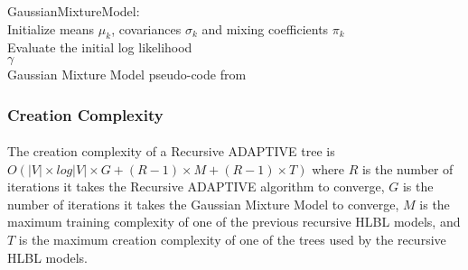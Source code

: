 \begin{algorithm} \label{code:GMM}
\SetAlgoLined
GaussianMixtureModel:
\\
Initialize means $\mu_k$, covariances $\sigma_k$ and mixing coefficients $\pi_k$
\\Evaluate the initial log likelihood
\\
\Return $\gamma$
\\
Gaussian Mixture Model pseudo-code from \cite{Bishop2006}
\end{algorithm} 

\subsubsection{Creation Complexity}
\paragraph{}
The creation complexity of a Recursive ADAPTIVE tree is $O ( |V| \times log|V| \times G + (R-1)\times M + (R-1)\times T)$ where $R$ is the number of iterations it takes the Recursive ADAPTIVE algorithm to converge, $G$ is the number of iterations it takes the Gaussian Mixture Model to converge, $M$ is the maximum training complexity of one of the previous recursive HLBL models, and $T$ is the maximum creation complexity of one of the trees used by the recursive HLBL models. 

